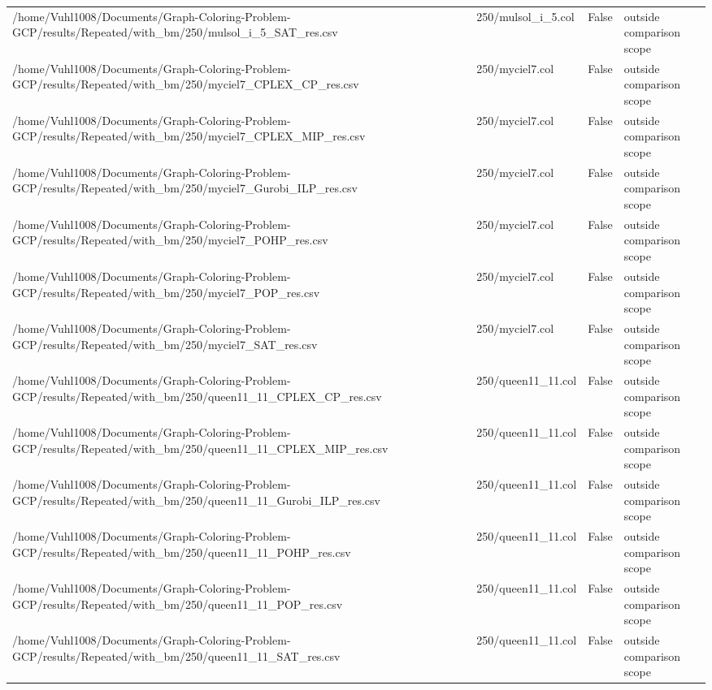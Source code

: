 \begin{table}[htbp]
\begin{tabular}{llll}
/home/Vuhl1008/Documents/Graph-Coloring-Problem-GCP/results/Repeated/with\_bm/250/mulsol\_i\_5\_SAT\_res.csv & 250/mulsol\_i\_5.col & False & outside comparison scope \\
/home/Vuhl1008/Documents/Graph-Coloring-Problem-GCP/results/Repeated/with\_bm/250/myciel7\_CPLEX\_CP\_res.csv & 250/myciel7.col & False & outside comparison scope \\
/home/Vuhl1008/Documents/Graph-Coloring-Problem-GCP/results/Repeated/with\_bm/250/myciel7\_CPLEX\_MIP\_res.csv & 250/myciel7.col & False & outside comparison scope \\
/home/Vuhl1008/Documents/Graph-Coloring-Problem-GCP/results/Repeated/with\_bm/250/myciel7\_Gurobi\_ILP\_res.csv & 250/myciel7.col & False & outside comparison scope \\
/home/Vuhl1008/Documents/Graph-Coloring-Problem-GCP/results/Repeated/with\_bm/250/myciel7\_POHP\_res.csv & 250/myciel7.col & False & outside comparison scope \\
/home/Vuhl1008/Documents/Graph-Coloring-Problem-GCP/results/Repeated/with\_bm/250/myciel7\_POP\_res.csv & 250/myciel7.col & False & outside comparison scope \\
/home/Vuhl1008/Documents/Graph-Coloring-Problem-GCP/results/Repeated/with\_bm/250/myciel7\_SAT\_res.csv & 250/myciel7.col & False & outside comparison scope \\
/home/Vuhl1008/Documents/Graph-Coloring-Problem-GCP/results/Repeated/with\_bm/250/queen11\_11\_CPLEX\_CP\_res.csv & 250/queen11\_11.col & False & outside comparison scope \\
/home/Vuhl1008/Documents/Graph-Coloring-Problem-GCP/results/Repeated/with\_bm/250/queen11\_11\_CPLEX\_MIP\_res.csv & 250/queen11\_11.col & False & outside comparison scope \\
/home/Vuhl1008/Documents/Graph-Coloring-Problem-GCP/results/Repeated/with\_bm/250/queen11\_11\_Gurobi\_ILP\_res.csv & 250/queen11\_11.col & False & outside comparison scope \\
/home/Vuhl1008/Documents/Graph-Coloring-Problem-GCP/results/Repeated/with\_bm/250/queen11\_11\_POHP\_res.csv & 250/queen11\_11.col & False & outside comparison scope \\
/home/Vuhl1008/Documents/Graph-Coloring-Problem-GCP/results/Repeated/with\_bm/250/queen11\_11\_POP\_res.csv & 250/queen11\_11.col & False & outside comparison scope \\
/home/Vuhl1008/Documents/Graph-Coloring-Problem-GCP/results/Repeated/with\_bm/250/queen11\_11\_SAT\_res.csv & 250/queen11\_11.col & False & outside comparison scope \\

\end{tabular}
\end{table}
